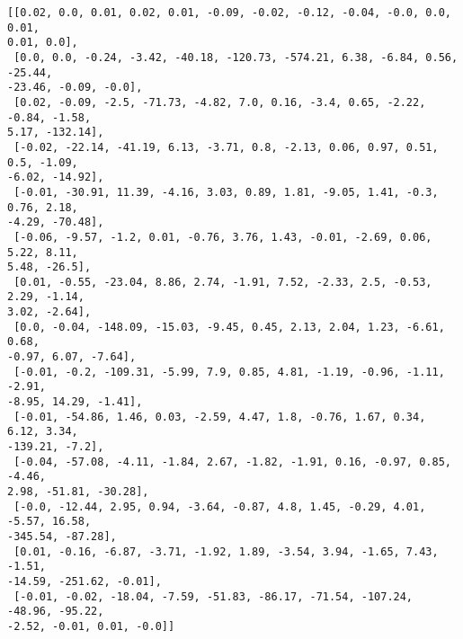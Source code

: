 \documentclass[11pt]{article}
\begin{document}
    \begin{Verbatim}[commandchars=\\\{\}]
[[0.02, 0.0, 0.01, 0.02, 0.01, -0.09, -0.02, -0.12, -0.04, -0.0, 0.0, 0.01,
0.01, 0.0],
 [0.0, 0.0, -0.24, -3.42, -40.18, -120.73, -574.21, 6.38, -6.84, 0.56, -25.44,
-23.46, -0.09, -0.0],
 [0.02, -0.09, -2.5, -71.73, -4.82, 7.0, 0.16, -3.4, 0.65, -2.22, -0.84, -1.58,
5.17, -132.14],
 [-0.02, -22.14, -41.19, 6.13, -3.71, 0.8, -2.13, 0.06, 0.97, 0.51, 0.5, -1.09,
-6.02, -14.92],
 [-0.01, -30.91, 11.39, -4.16, 3.03, 0.89, 1.81, -9.05, 1.41, -0.3, 0.76, 2.18,
-4.29, -70.48],
 [-0.06, -9.57, -1.2, 0.01, -0.76, 3.76, 1.43, -0.01, -2.69, 0.06, 5.22, 8.11,
5.48, -26.5],
 [0.01, -0.55, -23.04, 8.86, 2.74, -1.91, 7.52, -2.33, 2.5, -0.53, 2.29, -1.14,
3.02, -2.64],
 [0.0, -0.04, -148.09, -15.03, -9.45, 0.45, 2.13, 2.04, 1.23, -6.61, 0.68,
-0.97, 6.07, -7.64],
 [-0.01, -0.2, -109.31, -5.99, 7.9, 0.85, 4.81, -1.19, -0.96, -1.11, -2.91,
-8.95, 14.29, -1.41],
 [-0.01, -54.86, 1.46, 0.03, -2.59, 4.47, 1.8, -0.76, 1.67, 0.34, 6.12, 3.34,
-139.21, -7.2],
 [-0.04, -57.08, -4.11, -1.84, 2.67, -1.82, -1.91, 0.16, -0.97, 0.85, -4.46,
2.98, -51.81, -30.28],
 [-0.0, -12.44, 2.95, 0.94, -3.64, -0.87, 4.8, 1.45, -0.29, 4.01, -5.57, 16.58,
-345.54, -87.28],
 [0.01, -0.16, -6.87, -3.71, -1.92, 1.89, -3.54, 3.94, -1.65, 7.43, -1.51,
-14.59, -251.62, -0.01],
 [-0.01, -0.02, -18.04, -7.59, -51.83, -86.17, -71.54, -107.24, -48.96, -95.22,
-2.52, -0.01, 0.01, -0.0]]
    \end{Verbatim}

    \begin{center}
    \end{center}
    { \hspace*{\fill} \\}
    
    \begin{center}
    \end{center}
    { \hspace*{\fill} \\}
    
\end{document}
